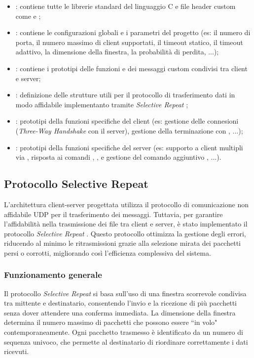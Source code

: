 \begin{itemize}
    \item {}: contiene tutte le librerie standard del linguaggio C e file header custom come  e ;
    \item {}: contiene le configurazioni globali e i parametri del progetto (es: il numero di porta, il numero massimo di client supportati, il timeout statico, il timeout adattivo, la dimensione della finestra, la probabilità di perdita, ...);
    \item {}: contiene i prototipi delle funzioni e dei messaggi custom condivisi tra client e server;
    \item {}: definizione delle strutture utili per il protocollo di trasferimento dati in modo affidabile implementanto tramite \textit{Selective Repeat} ;
    \item {}: prototipi della funzioni specifiche del client (es: gestione delle connesioni (\textit{Three-Way Handshake} con il server), gestione della terminazione con , ...);
    \item {}: prototipi della funzioni specifiche del server (es: supporto a client multipli via , risposta ai comandi , ,  e gestione del comando aggiuntivo , ...).
\end{itemize}

\subsection{Protocollo Selective Repeat }
L'architettura client-server progettata utilizza il protocollo di comunicazione non affidabile UDP per il trasferimento dei messaggi.
Tuttavia, per garantire l'affidabilità nella trasmissione dei file tra client e server, è stato implementato il protocollo \textit{Selective Repeat} .
Questo protocollo ottimizza la gestione degli errori, riducendo al minimo le ritrasmissioni grazie alla selezione mirata dei pacchetti persi o corrotti, migliorando così l'efficienza complessiva del sistema.

\subsubsection{Funzionamento generale}
Il protocollo \textit{Selective Repeat} si basa sull'uso di una finestra scorrevole condivisa tra mittente e destinatario, consentendo l'invio e la ricezione di più pacchetti senza dover attendere una conferma immediata.
La dimensione della finestra determina il numero massimo di pacchetti che possono essere ``in volo" contemporaneamente.
Ogni pacchetto trasmesso è identificato da un numero di sequenza univoco, che permette al destinatario di riordinare correttamente i dati ricevuti.

